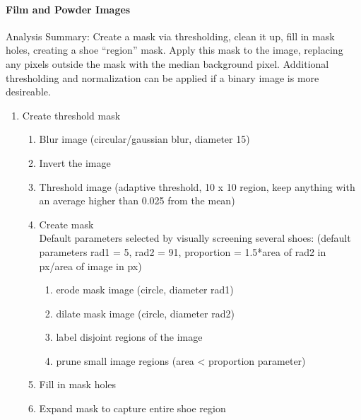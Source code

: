 \documentclass[]{book}
\providecommand{\tightlist}{%
  \setlength{\itemsep}{0pt}\setlength{\parskip}{0pt}}
\let\oldparagraph\paragraph
\renewcommand{\paragraph}[1]{\oldparagraph{#1}\mbox{}}
\begin{document}
\hypertarget{lss-paper-analysis-film}{%
\paragraph{Film and Powder Images}\label{lss-paper-analysis-film}}

Analysis Summary: Create a mask via thresholding, clean it up, fill in mask holes, creating a shoe ``region'' mask. Apply this mask to the image, replacing any pixels outside the mask with the median background pixel. Additional thresholding and normalization can be applied if a binary image is more desireable.

\begin{enumerate}
\def\labelenumi{\arabic{enumi}.}
\item
  Create threshold mask

  \begin{enumerate}
  \def\labelenumii{\alph{enumii}.}
  \tightlist
  \item
    Blur image (circular/gaussian blur, diameter 15)\\
  \item
    Invert the image\\
  \item
    Threshold image (adaptive threshold, 10 x 10 region, keep anything with an average higher than 0.025 from the mean)\\
  \item
    Create mask\\
    Default parameters selected by visually screening several shoes:
    (default parameters rad1 = 5, rad2 = {91}, proportion = 1.5*area of rad2 in px/area of image in px)\\

    \begin{enumerate}
    \def\labelenumiii{\arabic{enumiii}.}
    \tightlist
    \item
      erode mask image (circle, diameter rad1)
    \item
      dilate mask image (circle, diameter rad2)
    \item
      label disjoint regions of the image
    \item
      prune small image regions (area \textless{} proportion parameter)
    \end{enumerate}
  \item
    Fill in mask holes\\
  \item
    Expand mask to capture entire shoe region


\end{enumerate}
\end{enumerate}
\end{document}
